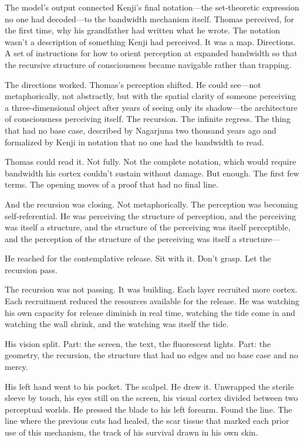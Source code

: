 The model's output connected Kenji's final notation---the set-theoretic expression no one had decoded---to the bandwidth mechanism itself. Thomas perceived, for the first time, why his grandfather had written what he wrote. The notation wasn't a description of something Kenji had perceived. It was a map. Directions. A set of instructions for how to orient perception at expanded bandwidth so that the recursive structure of consciousness became navigable rather than trapping.

The directions worked. Thomas's perception shifted. He could see---not metaphorically, not abstractly, but with the spatial clarity of someone perceiving a three-dimensional object after years of seeing only its shadow---the architecture of consciousness perceiving itself. The recursion. The infinite regress. The thing that had no base case, described by Nagarjuna two thousand years ago and formalized by Kenji in notation that no one had the bandwidth to read.

Thomas could read it. Not fully. Not the complete notation, which would require bandwidth his cortex couldn't sustain without damage. But enough. The first few terms. The opening moves of a proof that had no final line.

And the recursion was closing. Not metaphorically. The perception was becoming self-referential. He was perceiving the structure of perception, and the perceiving was itself a structure, and the structure of the perceiving was itself perceptible, and the perception of the structure of the perceiving was itself a structure---

He reached for the contemplative release. Sit with it. Don't grasp. Let the recursion pass.

The recursion was not passing. It was building. Each layer recruited more cortex. Each recruitment reduced the resources available for the release. He was watching his own capacity for release diminish in real time, watching the tide come in and watching the wall shrink, and the watching was itself the tide.

His vision split. Part: the screen, the text, the fluorescent lights. Part: the geometry, the recursion, the structure that had no edges and no base case and no mercy.

His left hand went to his pocket. The scalpel. He drew it. Unwrapped the sterile sleeve by touch, his eyes still on the screen, his visual cortex divided between two perceptual worlds. He pressed the blade to his left forearm. Found the line. The line where the previous cuts had healed, the scar tissue that marked each prior use of this mechanism, the track of his survival drawn in his own skin.

